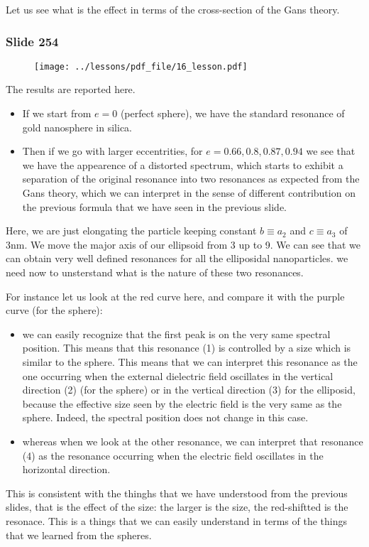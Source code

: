 \documentclass[../main/main.tex]{subfiles}
\begin{document}
Let us see what is the effect in terms of the cross-section of the Gans theory.


\newpage

\subsubsection{Slide 254}

\begin{figure}[h!]
\centering
\texttt{[image: ../lessons/pdf\_file/16\_lesson.pdf]}
\end{figure}


The results are reported here.

\begin{itemize}
\item If we start from \( e=0 \) (perfect sphere), we have the standard resonance of gold nanosphere in silica.
\item Then if we go with larger eccentrities, for \( e=0.66,0.8,0.87,0.94 \) we see that we have the appearence of a distorted spectrum, which starts to exhibit a separation of the original resonance into two resonances as expected from the Gans theory, which we can interpret in the sense of different contribution on the previous formula that we have seen in the previous slide.
\end{itemize}
Here, we are just elongating the particle keeping constant \( b \equiv a_2 \) and \( c \equiv a_3 \) of 3nm. We move the major axis of our ellipsoid from 3 up to 9.
We can see that we can obtain very well defined resonances for all the elliposidal nanoparticles. we need now to unsterstand what is the nature of these two resonances.

For instance let us look at the red curve here, and compare it with the purple curve (for the sphere):
\begin{itemize}
\item we can easily recognize that the first peak is on the very same spectral position. This means that this resonance (1) is controlled by a size which is similar to the sphere. This means that we can interpret this resonance as the one occurring when the external dielectric field oscillates in the vertical direction (2) (for the sphere) or in the vertical direction (3) for the elliposid, because the effective size seen by the electric field is the very same as the sphere. Indeed, the spectral position does not change in this case.

\item whereas when we look at the other resonance, we can interpret that resonance (4) as the resonance occurring when the electric field oscillates in the horizontal direction.
\end{itemize}
This is consistent with the thinghs that we have understood from the previous slides, that is the effect of the size: the larger is the size, the red-shiftted is the resonace. This is a things that we can easily understand in terms of the things that we learned from the spheres.
\end{document}
